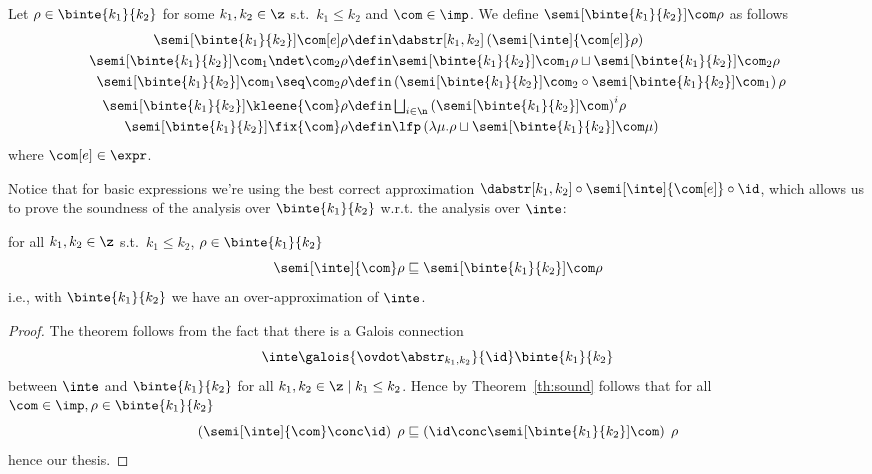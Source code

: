 \begin{definition}\label{def:boundedanalysis}
  Let \(\rho \in \binte{k_1}{k_2}\) for some \(k_1, k_2 \in \z\) s.t.\
  \(k_1 \leq k_2\) and \(\com \in \imp\). We define
  \(\semi[\binte{k_1}{k_2}]{\com}\rho\) as follows
  \begin{align*}
    \semi[\binte{k_1}{k_2}]{\com[e]}\rho & \defin \dabstr[k_1,k_2] \left(\semi[\inte]{\com[e]}\rho\right) \\
    \semi[\binte{k_1}{k_2}]{\com_1 \ndet \com_2}\rho & \defin \semi[\binte{k_1}{k_2}]{\com_1}\rho \sqcup \semi[\binte{k_1}{k_2}]{\com_2}\rho \\
    \semi[\binte{k_1}{k_2}]{\com_1 \seq \com_2}\rho & \defin \left(\semi[\binte{k_1}{k_2}]{\com_2} \circ \semi[\binte{k_1}{k_2}]{\com_1}\right)\rho \\
    \semi[\binte{k_1}{k_2}]{\kleene{\com}}\rho & \defin \textstyle\bigsqcup_{i\in\n}{\left({\semi[\binte{k_1}{k_2}]{\com}}\right)}^i\rho \\
    \semi[\binte{k_1}{k_2}]{\fix{\com}}\rho & \defin \lfp\left(\lambda \mu . \rho \sqcup \semi[\binte{k_1}{k_2}]{\com}\mu\right)
  \end{align*}
  where \(\com[e]\in\expr\). 
\end{definition}
\noindent
Notice that for basic expressions we're using the best correct
approximation
\(\dabstr[k_1,k_2] \circ \semi[\inte]{\com[e]} \circ \id\), which
allows us to prove the soundness of the analysis over
\(\binte{k_1}{k_2}\) w.r.t. the analysis over \(\inte\):
\begin{lemma}\label{le:leq}
  for all \(k_1, k_2\in\z\) s.t.\ \(k_1 \leq k_2\),
  \(\rho \in \binte{k_1}{k_2}\)
  \begin{equation*}
    \semi[\inte]{\com}\rho \sqsubseteq \semi[\binte{k_1}{k_2}]{\com}\rho
  \end{equation*}
  i.e., with \(\binte{k_1}{k_2}\) we have an over-approximation of \(\inte\).
\end{lemma}

\begin{proof}
  The theorem follows from the fact that there is a Galois connection
  \begin{equation*}
    \inte\galois{\ovdot\abstr_{k_1, k_2}}{\id}\binte{k_1}{k_2}
  \end{equation*}
  between \(\inte\) and \(\binte{k_1}{k_2}\) for all
  \(k_1, k_2 \in \z \mid k_1 \leq k_2\). Hence by
  Theorem~\ref{th:sound} follows that for all
  \(\com\in\imp, \rho \in \binte{k_1}{k_2}\)
  \begin{equation*}
    \left(\semi[\inte]{\com} \conc \id \right)\;\rho \sqsubseteq  \left(\id \conc \semi[\binte{k_1}{k_2}]{\com}\right)\;\rho
  \end{equation*}
  hence our thesis.
\end{proof}

